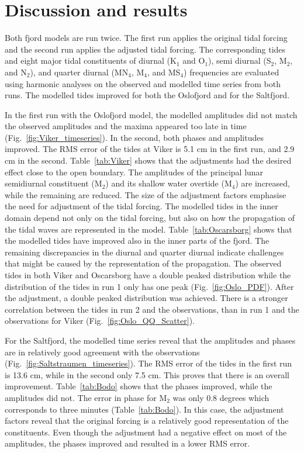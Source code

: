 \section{Discussion and results}

Both fjord models are run twice. The first run applies the original tidal forcing and the second run applies the adjusted tidal forcing. The corresponding tides and eight major tidal constituents of diurnal (K$_1$ and O$_1$), semi diurnal (S$_2$, M$_2$, and N$_2$), and quarter diurnal (MN$_4$, M$_4$, and MS$_4$) frequencies are evaluated using harmonic analyses on the observed and modelled time series from both runs. The modelled tides improved for both the Oslofjord and for the Saltfjord. 

In the first run with the Oslofjord model, the modelled amplitudes did not match the observed amplitudes and the maxima appeared too late in time (Fig.~\ref{fig:Viker_timeseries}). In the second, both phases and amplitudes improved. 
The RMS error of the tides at Viker is 5.1 cm in the first run, and 2.9 cm in the second. 
Table~\ref{tab:Viker} shows that the adjustments had the desired effect close to the open boundary. The amplitudes of the principal lunar semidiurnal constituent (M$_2$) and its shallow water overtide (M$_4$) are increased, while the remaining are reduced. The size of the adjustment factors emphasise the need for adjustment of the tidal forcing. 
The modelled tides in the inner domain depend not only on the tidal forcing, but also on how the propagation of the tidal waves are represented in the model. Table~\ref{tab:Oscarsborg} shows that the modelled tides have improved also in the inner parts of the fjord. The remaining  discrepancies in the diurnal and quarter diurnal indicate challenges that might be caused by the representation of the propagation. 
The observed tides in both Viker and Oscarsborg have a double peaked distribution while the distribution of the tides in run 1 only has one peak (Fig.~\ref{fig:Oslo_PDF}). After the adjustment, a double peaked distribution was achieved.
There is a stronger correlation between the tides in run 2 and the observations, than in run 1 and the observations for Viker (Fig.~\ref{fig:Oslo_QQ_Scatter}). 

For the Saltfjord, the modelled time series reveal that the amplitudes and phases are in relatively good agreement with the observations (Fig.~\ref{fig:Saltstraumen_timeseries}). The RMS error of the tides in the first run is 13.6 cm, while in the second only 7.5 cm. This proves that there is an overall improvement. Table~\ref{tab:Bodo} shows that the phases improved, while the amplitudes did not. The error in phase for M$_2$ was only $0.8$ degrees which corresponds to three minutes (Table~\ref{tab:Bodo}). In this case, the adjustment factors reveal that the original forcing is a relatively good representation of the constituents. Even though the adjustment had a negative effect on most of the amplitudes, the phases improved and resulted in a lower RMS error. 

